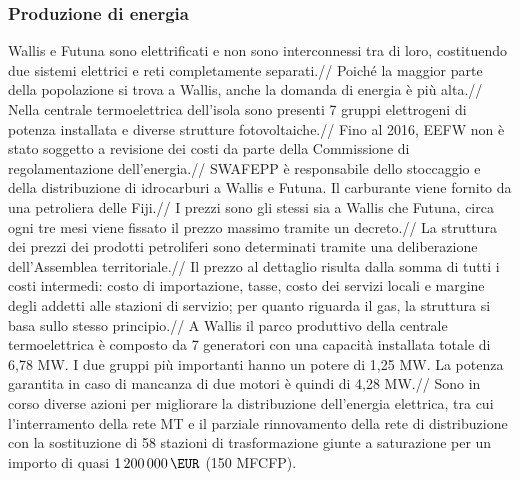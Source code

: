 \documentclass[fleqn,10pt]{SelfArx} %
\begin{document}
\subsubsection{Produzione di energia}
Wallis e Futuna sono elettrificati e non sono interconnessi tra di loro, costituendo due sistemi elettrici e reti completamente separati.// 
Poiché la maggior parte della popolazione si trova a Wallis, anche la domanda di energia è più alta.//
Nella centrale termoelettrica dell'isola sono presenti 7 gruppi elettrogeni di potenza installata e diverse strutture fotovoltaiche.//
Fino al 2016, EEFW non è stato soggetto a revisione dei costi da parte della Commissione di regolamentazione dell'energia.//
SWAFEPP è responsabile dello stoccaggio e della distribuzione di idrocarburi a Wallis e Futuna. Il carburante viene fornito da una petroliera delle Fiji.//
I prezzi sono gli stessi sia a Wallis che Futuna, circa ogni tre mesi viene fissato il prezzo massimo tramite un decreto.//
La struttura dei prezzi dei prodotti petroliferi sono determinati tramite una deliberazione dell'Assemblea territoriale.//
Il prezzo al dettaglio risulta dalla somma di tutti i costi intermedi: costo di importazione, tasse, costo dei servizi locali e margine degli addetti alle stazioni di servizio; per quanto riguarda il gas, la struttura si basa sullo stesso principio.//
A Wallis il parco produttivo della centrale termoelettrica è composto da 7 generatori con una capacità installata totale di 6,78 MW. I due gruppi più importanti hanno un potere di 1,25 MW. La potenza garantita in caso di mancanza di due motori è quindi di 4,28 MW.//
Sono in corso diverse azioni per migliorare la distribuzione dell'energia elettrica, tra cui l'interramento della rete MT e il parziale rinnovamento della rete di distribuzione con la sostituzione di 58 stazioni di trasformazione giunte a saturazione per un importo di quasi \(\SI{1200000}{\EUR}\) (150 MFCFP).
\end{document}
